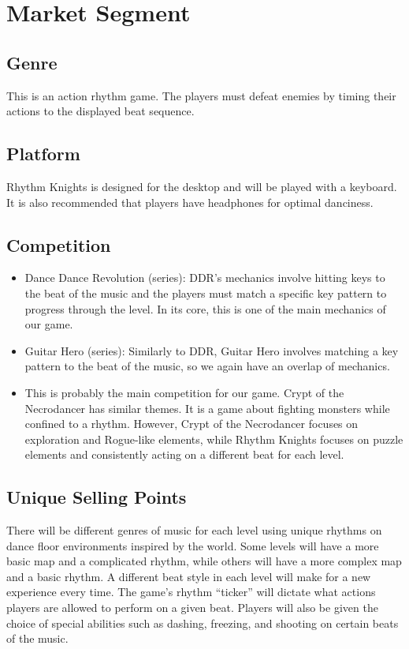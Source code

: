\documentclass[]{article}
\begin{document}
\pagebreak
\section*{Market Segment}
\subsection*{Genre}
This is an action rhythm game. The players must defeat enemies by 
timing their actions to the displayed beat sequence. 

\subsection*{Platform}
Rhythm Knights is designed for the desktop and will be played with a keyboard. 
It is also recommended that players have headphones for optimal danciness. 

\subsection*{Competition}
\begin{itemize}
\item Dance Dance Revolution (series): DDR's mechanics involve hitting
  keys to the beat of the music and the players must match a specific
  key pattern to progress through the level. In its core, this is one of
  the main mechanics of our game.
\item Guitar Hero (series): Similarly to DDR, Guitar Hero involves
  matching a key pattern to the beat of the music, so we again have an
  overlap of mechanics.
\item This is probably the main competition for our game. Crypt of the
  Necrodancer has similar themes. It is a game about fighting monsters
  while confined to a rhythm. However, Crypt of the Necrodancer focuses
  on exploration and Rogue-like elements, while Rhythm Knights focuses on
  puzzle elements and consistently acting on a different beat for each
  level.
\end{itemize}
\subsection*{Unique Selling Points}
There will be different genres of music for each level using unique
rhythms on dance floor environments inspired by the world. Some levels
will have a more basic map and a complicated rhythm, while others will
have a more complex map and a basic rhythm. A different beat style in
each level will make for a new experience every time. The game's
rhythm ``ticker'' will dictate what actions players are allowed to
perform on a given beat. Players will also be given the choice of
special abilities such as dashing, freezing, and shooting on certain
beats of the music.
\end{document}

